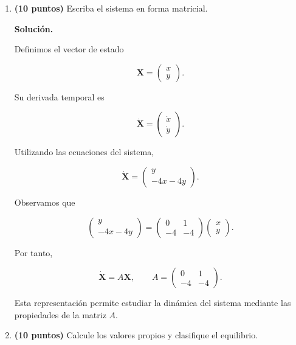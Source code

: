 \documentclass[a4paper,12pt]{article}
\newcommand{\solucion}{
\par\medskip
{\color{solutioncolor}\textbf{Solución.}}
\par
}
\begin{document}
\begin{enumerate}[leftmargin=*,
itemsep=0.8cm]
\begin{enumerate}[label=\alph*),
leftmargin=*,itemsep=0.5cm]
De la primera ecuación, $y_*=0$. Sustituyendo en la segunda, $-4x_*=0$. Por consiguiente, $x_*=0$. El sistema posee un único
punto de equilibrio:
\[
\boxed{(x_*,y_*)=(0,0).}
\]

\item \textbf{(10 puntos)}
Escriba el sistema en
forma matricial.

\solucion

Definimos el vector de estado

\[
\mathbf X=
\begin{pmatrix}
x\\y
\end{pmatrix}.
\]

Su derivada temporal es

\[
\dot{\mathbf X}=
\begin{pmatrix}
\dot x\\\dot y
\end{pmatrix}.
\]

Utilizando las ecuaciones
del sistema,

\[
\dot{\mathbf X}=
\begin{pmatrix}
y\\-4x-4y
\end{pmatrix}.
\]

Observamos que

\[
\begin{pmatrix}
y\\-4x-4y
\end{pmatrix}
=
\begin{pmatrix}
0&1\\
-4&-4
\end{pmatrix}
\begin{pmatrix}
x\\y
\end{pmatrix}.
\]

Por tanto,

\[
\boxed{
\dot{\mathbf X}
=A\mathbf X,
\qquad
A=
\begin{pmatrix}
0&1\\
-4&-4
\end{pmatrix}.
}
\]

Esta representación permite
estudiar la dinámica del
sistema mediante las propiedades
de la matriz $A$.

\item \textbf{(10 puntos)}
Calcule los valores propios
y clasifique el equilibrio.


\end{enumerate}
\end{enumerate}
\end{document}
